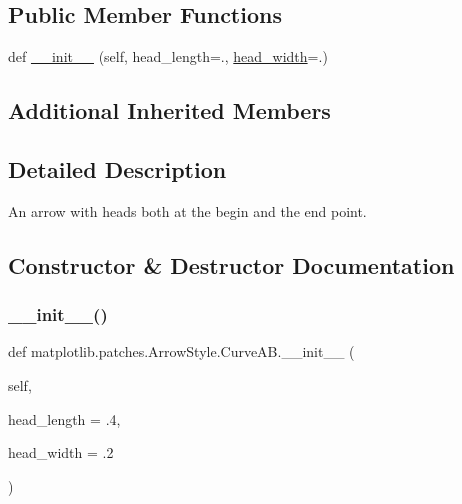 \subsection*{Public Member Functions}
\begin{DoxyCompactItemize}
\item 
def \hyperlink{classmatplotlib_1_1patches_1_1ArrowStyle_1_1CurveAB_afebe26ef34909c8cb073f8f3f25d1abf}{\+\_\+\+\_\+init\+\_\+\+\_\+} (self, head\+\_\+length=., \hyperlink{classmatplotlib_1_1patches_1_1ArrowStyle_1_1__Curve_a360e40f4780784399d97fd36b8569ab7}{head\+\_\+width}=.)
\end{DoxyCompactItemize}
\subsection*{Additional Inherited Members}


\subsection{Detailed Description}
\begin{DoxyVerb}An arrow with heads both at the begin and the end point.\end{DoxyVerb}
 

\subsection{Constructor \& Destructor Documentation}
\mbox{\label{classmatplotlib_1_1patches_1_1ArrowStyle_1_1CurveAB_afebe26ef34909c8cb073f8f3f25d1abf}} 
\subsubsection{\texorpdfstring{\+\_\+\+\_\+init\+\_\+\+\_\+()}{\_\_init\_\_()}}
{\footnotesize\ttfamily def matplotlib.\+patches.\+Arrow\+Style.\+Curve\+A\+B.\+\_\+\+\_\+init\+\_\+\+\_\+ (\begin{DoxyParamCaption}\item[{}]{self,  }\item[{}]{head\+\_\+length = {\ttfamily .4},  }\item[{}]{head\+\_\+width = {\ttfamily .2} }\end{DoxyParamCaption})}

